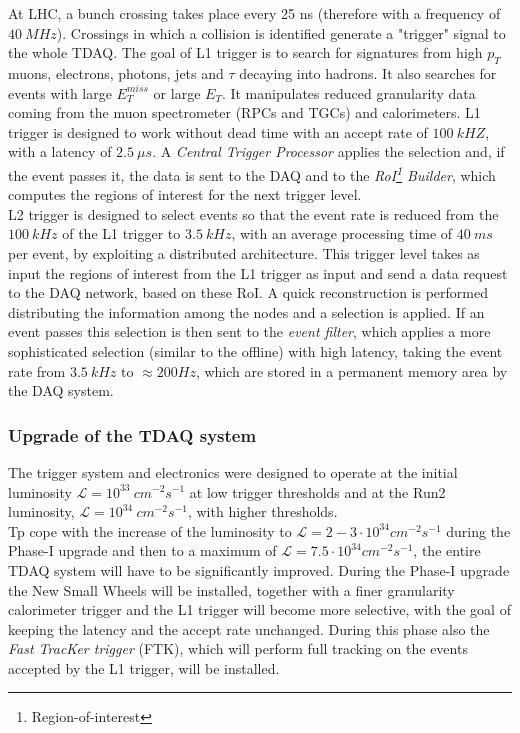 \documentclass[a4paper,twoside,12pt]{article}
\begin{document}
At LHC, a bunch crossing takes place every 25 ns (therefore with a frequency of $40\ MHz$). Crossings in which a collision is identified generate a "trigger" signal to the whole TDAQ. The goal of L1 trigger is to search for signatures from high $p_{T}$ muons, electrons,
photons, jets and $\tau$ decaying into hadrons. It also searches for events with large $E_{T}^{miss}$ or large $E_{T}$. It manipulates reduced granularity data coming from the muon
spectrometer (RPCs and TGCs) and calorimeters. L1 trigger is designed to work without dead time with an accept rate of $100\ kHZ$, with a latency of $2.5\ \mu s$. A \textit{Central Trigger Processor} applies
the selection and, if the event passes it, the data is
sent to the DAQ and to the \textit{RoI\footnote{Region-of-interest} Builder}, which computes the regions of interest for the next trigger level.\\
L2 trigger is designed to select events so that the event rate is reduced from the $100\ kHz$ of the L1 trigger to $3.5\ kHz$, with an average processing time of $40\ ms$ per event, by
exploiting a distributed architecture. This trigger
level takes as input the regions of interest from the L1 trigger as input and send a data request to the DAQ network, based on these RoI. A quick reconstruction is performed
distributing the information among the nodes and a selection is applied. If an event passes this selection is then sent to the \textit{event filter}, which applies a more sophisticated selection 
(similar to the offline) with high latency, taking the event rate from $3.5\ kHz$ to $\approx 200 Hz$, which are stored in a permanent memory area by the DAQ system.

\subsubsection*{Upgrade of the TDAQ system}
The trigger system and electronics were designed to operate at the initial luminosity 
$\mathcal{L} = 10^{33}\ cm^{-2}s^{-1}$ at low trigger thresholds and at the Run2
luminosity, $\mathcal{L} = 10^{34}\ cm^{-2}s^{-1}$, with higher thresholds\cite{scoping}.\\

Tp cope with the increase of the luminosity to $\mathcal{L} = 2-3 \cdot 10^{34} cm^{-2}s^{-1}$ during
the Phase-I upgrade and then to a maximum of $\mathcal{L} = 7.5 \cdot 10^{34} cm^{-2}s^{-1}$, the entire TDAQ system will have to be significantly improved. During the Phase-I upgrade the New Small Wheels will be installed, together with a finer granularity calorimeter
trigger and the L1 trigger will become more selective, with the goal of keeping the latency and the accept rate unchanged. During this phase also the \textit{Fast TracKer trigger} (FTK)\cite{FTK_TDR}, which will perform
full tracking on the events accepted by the L1 trigger, will be installed. \\
\end{document}
